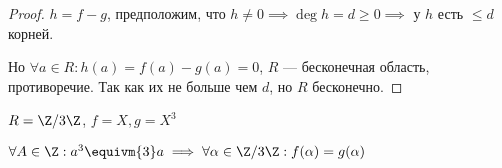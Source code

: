 \begin{proof}

    $h = f - g$, предположим, что $h \neq 0 \implies \deg h = d \geq 0 \implies$ у $h$ есть $\leq d$ корней.

    Но $\forall a \in R: h(a) = f(a) - g(a) = 0$, $R$ --- бесконечная область, противоречие. Так как их не больше чем $d$, но $R$ бесконечно.
\end{proof}

\begin{example}
    $R = \Z/3\Z$, $f = X, g = X^3$

    $\forall A \in \Z: a^3 \equivm{3} a \implies \forall \alpha \in \Z/3\Z: f(\alpha) = g(\alpha)$
\end{example}
